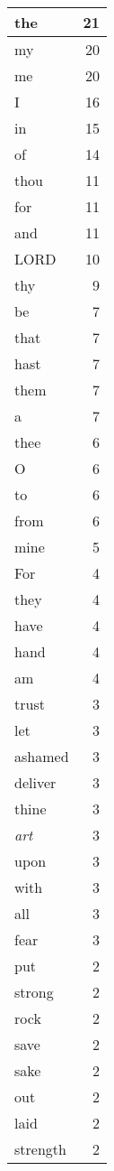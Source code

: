 \begin{center}
\begin{longtable}{l|r}
\hline \hline
\endlastfoot
the & 21 \\ \hline
my & 20 \\ \hline
me & 20 \\ \hline
I & 16 \\ \hline
in & 15 \\ \hline
of & 14 \\ \hline
thou & 11 \\ \hline
for & 11 \\ \hline
and & 11 \\ \hline
LORD & 10 \\ \hline
thy & 9 \\ \hline
be & 7 \\ \hline
that & 7 \\ \hline
hast & 7 \\ \hline
them & 7 \\ \hline
a & 7 \\ \hline
thee & 6 \\ \hline
O & 6 \\ \hline
to & 6 \\ \hline
from & 6 \\ \hline
mine & 5 \\ \hline
For & 4 \\ \hline
they & 4 \\ \hline
have & 4 \\ \hline
hand & 4 \\ \hline
am & 4 \\ \hline
trust & 3 \\ \hline
let & 3 \\ \hline
ashamed & 3 \\ \hline
deliver & 3 \\ \hline
thine & 3 \\ \hline
\emph{art} & 3 \\ \hline
upon & 3 \\ \hline
with & 3 \\ \hline
all & 3 \\ \hline
fear & 3 \\ \hline
put & 2 \\ \hline
strong & 2 \\ \hline
rock & 2 \\ \hline
save & 2 \\ \hline
sake & 2 \\ \hline
out & 2 \\ \hline
laid & 2 \\ \hline
strength & 2 \\ \hline

\end{longtable}
\end{center}

